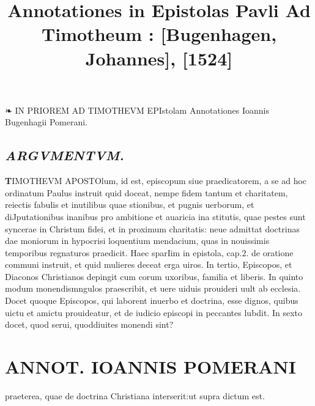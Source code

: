 \documentclass{article}
\begin{document}
\date{}
        \title{Annotationes in Epistolas Pavli Ad Timotheum : [Bugenhagen, Johannes], [1524]}
\maketitle
\tableofcontents
\clearpage
\begin{pages} 
\beginnumbering
        ❧ IN PRIOREM AD TIMOTHEVM EPIstolam Annotationes Ioannis Bugenhagii Pomerani. 
{}
\subsection*{\textit{ARGVMENTVM. }}\pstart \huge\textbf{T}\normalsize IMOTHEVM APOSTOlum, id est, episcopum siue praedicatorem, a se ad hoc ordinatum Paulus instruit quid doceat, nempe fidem tantum et charitatem, reiectis fabulis et inutilibus quae stionibus, et pugnis uerborum, et diJputationibus inanibus pro ambitione et auaricia ina stitutis, quae pestes sunt syncerae in Christum fidei, et in proximum charitatis: neue admittat doctrinas dae moniorum in hypocrisi loquentium mendacium, quas in nouissimis temporibus regnaturos praedicit. Haec sparIim in epistola, cap.2. de oratione communi instruit, et quid mulieres deceat erga uiros. In tertio, Episcopos, et Diaconos Christianos depingit cum corum uxoribus, familia et liberis. In quinto modum monendismngulos praescribit, et uere uiduis prouideri uult ab ecclesia. Docet quoque Episcopos, qui laborent inuerbo et doctrina, esse dignos, quibus uictu et amictu prouideatur, et de iudicio episcopi in peccantes lubdit. In sexto docet, quod  serui, quoddiuites monendi sint?  \pend
\section*{ANNOT. IOANNIS POMERANI }\pstart praeterea, quae de doctrina Christiana interserit:ut supra dictum est.  \pend
{}
{}

\end{pages}
\end{document}
